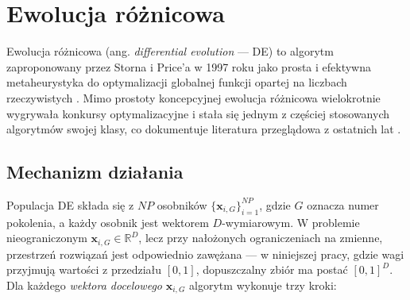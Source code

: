 \section{Ewolucja różnicowa}
\label{sec:de}
Ewolucja różnicowa (ang. \textit{differential evolution} --- DE) to algorytm zaproponowany przez Storna i Price'a w 1997 roku jako prosta i efektywna metaheurystyka do optymalizacji globalnej funkcji opartej na liczbach rzeczywistych \cite{Storn1997}. Mimo prostoty koncepcyjnej ewolucja różnicowa wielokrotnie wygrywała konkursy optymalizacyjne i stała się jednym z częściej stosowanych algorytmów swojej klasy, co dokumentuje literatura przeglądowa z ostatnich lat \cite{Bilal2020}.

\subsection{Mechanizm działania}
Populacja DE składa się z $NP$ osobników $\{\mathbf{x}_{i,G}\}_{i=1}^{NP}$, gdzie $G$ oznacza numer pokolenia, a każdy osobnik jest wektorem $D$-wymiarowym. W problemie nieograniczonym $\mathbf{x}_{i,G} \in \mathbb{R}^D$, lecz przy nałożonych ograniczeniach na zmienne, przestrzeń rozwiązań jest odpowiednio zawężana --- w niniejszej pracy, gdzie wagi przyjmują wartości z przedziału $[0, 1]$, dopuszczalny zbiór ma postać $[0, 1]^D$. Dla każdego \textit{wektora docelowego} $\mathbf{x}_{i,G}$ algorytm wykonuje trzy kroki:
